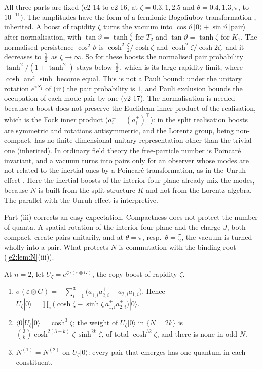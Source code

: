 All three parts are fixed (e2-14 to e2-16, at $\zeta=0.3,1,2.5$ and $\theta=0.4,1.3,\pi$, to $10^{-11}$). The amplitudes have the form of a
fermionic Bogoliubov transformation \cite{Bogoliubov58,Berezin66}, inherited. A boost of rapidity $\zeta$ turns the vacuum into
$\cos\vartheta\,|0\rangle+\sin\vartheta\,|\text{pair}\rangle$ after normalisation, with $\tan\vartheta=\tanh\tfrac\zeta2$ for $T_2$ and $\tan\vartheta=\tanh\zeta$ for
$K_1$. The normalised persistence $\cos^2\vartheta$ is $\cosh^2\tfrac\zeta2/\cosh\zeta$ and $\cosh^2\zeta/\cosh2\zeta$, and it decreases to $\tfrac12$ as
$\zeta\to\infty$. So for these boosts the normalised pair probability $\tanh^2/(1+\tanh^2)$ stays below $\tfrac12$, which is its large-rapidity
limit, where $\cosh$ and $\sinh$ become equal. This is not a Pauli bound: under the unitary rotation $e^{\pi S_1}$ of (iii) the pair probability
is $1$, and Pauli exclusion bounds the occupation of each mode pair by one (y2-17). The normalisation is needed because a boost does not preserve the Euclidean inner
product of the realisation, which is the Fock inner product ($a^-_i=(a^+_i)^{\!\top}$): in the split realisation boosts are symmetric and rotations
antisymmetric, and the Lorentz group, being non-compact, has no finite-dimensional unitary representation other than the trivial one
\cite{WeinbergQFT} (inherited). In ordinary field theory the free-particle number is Poincar\'e invariant, and a vacuum turns into
pairs only for an observer whose modes are not related to the inertial ones by a Poincar\'e transformation, as in the Unruh effect
\cite{Unruh76}. Here the inertial boosts of the interior four-plane already mix the modes, because $N$ is built from the split structure
$K$ and not from the Lorentz algebra. The parallel with the Unruh effect is interpretive.

Part (iii) corrects an easy expectation. Compactness does not protect the number of quanta. A spatial rotation of the interior four-plane
and the charge $J$, both compact, create pairs unitarily, and at $\theta=\pi$, resp.\ $\theta=\tfrac\pi2$, the vacuum is turned wholly into a pair.
What protects $N$ is commutation with the binding root (\cref{e2:lem:N}(iii)).

\begin{proposition}
\label{e2:prop:copyboost}
At $n=2$, let $U_\zeta=e^{\zeta\sigma(\varepsilon\otimes G)}$, the copy boost of rapidity $\zeta$.
\begin{enumerate}[label=(\roman*),leftmargin=2.2em]
\item $\sigma(\varepsilon\otimes G)=-\sum_{i=1}^3\bigl(a^+_{1,i}a^+_{2,i}+a^-_{2,i}a^-_{1,i}\bigr)$. Hence
$U_\zeta|0\rangle=\prod_i\bigl(\cosh\zeta-\sinh\zeta\,a^+_{1,i}a^+_{2,i}\bigr)|0\rangle$.
\item $\langle0|U_\zeta|0\rangle=\cosh^3\zeta$; the weight of $U_\zeta|0\rangle$ in $\{N=2k\}$ is $\binom3k\cosh^{2(3-k)}\zeta\,\sinh^{2k}\zeta$, of total $\cosh^32\zeta$, and
there is none in odd $N$.
\item $N^{(1)}=N^{(2)}$ on $U_\zeta|0\rangle$: every pair that emerges has one quantum in each constituent.
\end{enumerate}
\end{proposition}

